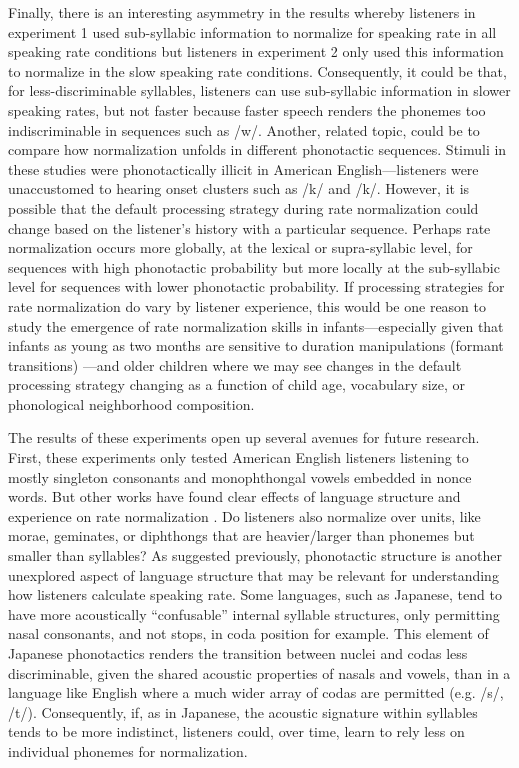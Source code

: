 \documentclass[preprint]{JASA}
\begin{document}
Finally, there is an interesting asymmetry in the results whereby listeners in experiment 1 used sub-syllabic information to normalize for speaking rate in all speaking rate conditions but listeners in experiment 2 only used this information to normalize in the slow speaking rate conditions. Consequently, it could be that, for less-discriminable syllables, listeners can use sub-syllabic information in slower speaking rates, but not faster because faster speech renders the phonemes too indiscriminable in sequences such as /w\textsci/. Another, related topic, could be to compare how normalization unfolds in different phonotactic sequences. Stimuli in these studies were phonotactically illicit in American English---listeners were unaccustomed to hearing onset clusters such as /\textteshlig k/ and /\textesh k/. However, it is possible that the default processing strategy during rate normalization could change based on the listener's history with a particular sequence. Perhaps rate normalization occurs more globally, at the lexical or supra-syllabic level, for sequences with high phonotactic probability but more locally at the sub-syllabic level for sequences with lower phonotactic probability. If processing strategies for rate normalization do vary by listener experience, this would be one reason to study the emergence of rate normalization skills in infants---especially given that infants as young as two months are sensitive to duration manipulations (formant transitions) \citep{eimasContextualEffectsInfant1980}---and older children where we may see changes in the default processing strategy changing as a function of child age, vocabulary size, or phonological neighborhood composition.  

The results of these experiments open up several avenues for future research. First, these experiments only tested American English listeners listening to mostly singleton consonants and monophthongal vowels embedded in nonce words. But other works have found clear effects of language structure and experience on rate normalization \citep{baese-berkNonnativeSpeakersUse2016,steffmanIntonationalStructureMediates2019}. Do listeners also normalize over units, like morae, geminates, or diphthongs that are heavier/larger than phonemes but smaller than syllables? As suggested previously, phonotactic structure is another unexplored aspect of language structure that may be relevant for understanding how listeners calculate speaking rate. Some languages, such as Japanese, tend to have more acoustically ``confusable'' internal syllable structures, only permitting nasal consonants, and not stops, in coda position for example. This element of Japanese phonotactics renders the transition between nuclei and codas less discriminable, given the shared acoustic properties of nasals and vowels, than in a language like English where a much wider array of codas are permitted (e.g. /s/, /t/). Consequently, if, as in Japanese, the acoustic signature within syllables tends to be more indistinct, listeners could, over time, learn to rely less on individual phonemes for normalization. 
\end{document}
